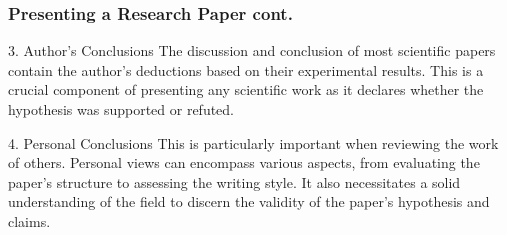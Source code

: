 \documentclass[11pt,xcolor={dvipsnames},hyperref={pdftex,pdfpagemode=UseNone,hidelinks,pdfdisplaydoctitle=true},usepdftitle=false]{beamer}
\begin{document}
\begin{frame}
	\frametitle{Presenting a Research Paper cont.}
	\begin{block}{3. Author's Conclusions}
		The discussion and conclusion of most scientific papers contain the author's deductions based on their experimental results. This is a crucial component of presenting any scientific work as it declares whether the hypothesis was supported or refuted.
	\end{block}
	\begin{block}{4. Personal Conclusions}
		This is particularly important when reviewing the work of others. Personal views can encompass various aspects, from evaluating the paper's structure to assessing the writing style. It also necessitates a solid understanding of the field to discern the validity of the paper's hypothesis and claims.
	\end{block}
\end{frame}

\begin{frame}
\end{frame}

\lastslide
\end{document}
